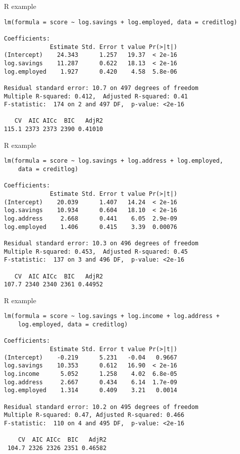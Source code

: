\documentclass[14pt]{beamer}
\begin{document}
\begin{frame}[fragile]{R example}\footnotesize
\begin{verbatim}
lm(formula = score ~ log.savings + log.employed, data = creditlog)

Coefficients:
             Estimate Std. Error t value Pr(>|t|)
(Intercept)    24.343      1.257   19.37  < 2e-16
log.savings    11.287      0.622   18.13  < 2e-16
log.employed    1.927      0.420    4.58  5.8e-06

Residual standard error: 10.7 on 497 degrees of freedom
Multiple R-squared: 0.412,  Adjusted R-squared: 0.41 
F-statistic:  174 on 2 and 497 DF,  p-value: <2e-16 

   CV  AIC AICc  BIC   AdjR2
115.1 2373 2373 2390 0.41010
\end{verbatim}
\vspace*{10cm}

\end{frame}

\begin{frame}[fragile]{R example}\footnotesize
\begin{verbatim}
lm(formula = score ~ log.savings + log.address + log.employed, 
    data = creditlog)

Coefficients:
             Estimate Std. Error t value Pr(>|t|)
(Intercept)    20.039      1.407   14.24  < 2e-16
log.savings    10.934      0.604   18.10  < 2e-16
log.address     2.668      0.441    6.05  2.9e-09
log.employed    1.406      0.415    3.39  0.00076

Residual standard error: 10.3 on 496 degrees of freedom
Multiple R-squared: 0.453,  Adjusted R-squared: 0.45 
F-statistic:  137 on 3 and 496 DF,  p-value: <2e-16 

   CV  AIC AICc  BIC   AdjR2
107.7 2340 2340 2361 0.44952
\end{verbatim}
\vspace*{10cm}

\end{frame}

\begin{frame}[fragile]{R example}\footnotesize
\begin{verbatim}
lm(formula = score ~ log.savings + log.income + log.address + 
    log.employed, data = creditlog)

Coefficients:
             Estimate Std. Error t value Pr(>|t|)
(Intercept)    -0.219      5.231   -0.04   0.9667
log.savings    10.353      0.612   16.90  < 2e-16
log.income      5.052      1.258    4.02  6.8e-05
log.address     2.667      0.434    6.14  1.7e-09
log.employed    1.314      0.409    3.21   0.0014

Residual standard error: 10.2 on 495 degrees of freedom
Multiple R-squared: 0.47, Adjusted R-squared: 0.466 
F-statistic:  110 on 4 and 495 DF,  p-value: <2e-16 

    CV  AIC AICc  BIC   AdjR2
 104.7 2326 2326 2351 0.46582
\end{verbatim}
\vspace*{10cm}
\end{frame}
\end{document}
